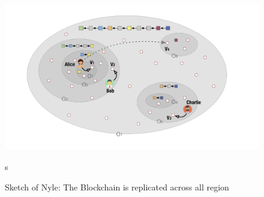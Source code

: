 \documentclass[a4paper,11pt,oneside]{report}
\begin{document}
\begin{figure}[!h]
\centering
\includegraphics[width=400pt]{figures/Nyle}
\caption{Sketch of Nyle: The Blockchain is replicated across all region}s
\label{fig:Nyle}
\end{figure}
\end{document}
